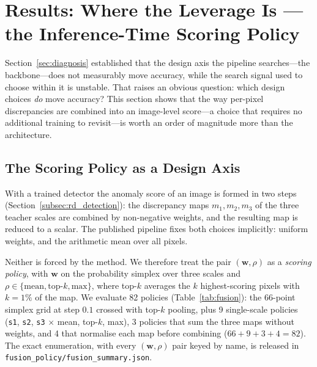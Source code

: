 
\section{Results: Where the Leverage Is --- the Inference-Time Scoring Policy}
\label{sec:leverage}

Section~\ref{sec:diagnosis} established that the design axis the pipeline
searches---the backbone---does not measurably move accuracy, while the search
signal used to choose within it is unstable. That raises an obvious question:
which design choices \emph{do} move accuracy? This section shows that the way
per-pixel discrepancies are combined into an image-level score---a choice that
requires no additional training to revisit---is worth an order of magnitude more
than the architecture.

\subsection{The Scoring Policy as a Design Axis}
\label{subsec:policy_space}

With a trained detector the anomaly score of an image is formed in two steps
(Section~\ref{subsec:rd_detection}): the discrepancy maps $m_1, m_2, m_3$ of the
three teacher scales are combined by non-negative weights, and the resulting map
is reduced to a scalar. The published pipeline fixes both choices implicitly:
uniform weights, and the arithmetic mean over all pixels.

Neither is forced by the method. We therefore treat the pair
$(\mathbf{w}, \rho)$ as a \emph{scoring policy}, with
$\mathbf{w}$ on the probability simplex over three scales and
$\rho \in \{\text{mean}, \text{top-}k, \text{max}\}$, where top-$k$ averages the
$k$ highest-scoring pixels with $k = 1\%$ of the map. We evaluate 82 policies (Table~\ref{tab:fusion}):
the 66-point simplex grid at step $0.1$ crossed with top-$k$ pooling, plus 9
single-scale policies (\texttt{s1}, \texttt{s2}, \texttt{s3} $\times$ mean, top-$k$,
max), 3 policies that sum the three maps without weights, and 4 that normalise each
map before combining ($66+9+3+4 = 82$). The exact enumeration, with every
$(\mathbf{w},\rho)$ pair keyed by name, is released in
\texttt{fusion\_policy/fusion\_summary.json}.

